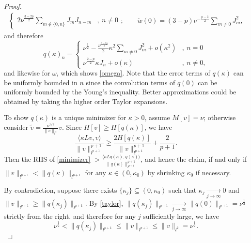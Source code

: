\documentclass{article}
\numberwithin{equation}{section}
\begin{document}
\begin{proof}
\begin{equation*}
\begin{split}
\begin{cases}
            2 \nu^{\frac{3-2p}{2}}\sum\limits_{m \notin \{0,n\}} J_{m} J_{n-m} & ,\ n \neq 0
    \end{cases};
    \qquad \ddot{w}(0) = (3-p) \nu^{-\frac{p-1}{2}} \sum_{m \neq 0} J_{m}^2,
\end{split}
\end{equation*}
and therefore
\begin{equation}\label{taylor}
    q(\kappa)_n = 
    \begin{cases}
            \nu^{\frac{1}{2}}-\frac{\nu^{\frac{3-2p}{2}}}{2}\kappa^2 \sum\limits_{m \neq 0} J_{m}^2 + o(\kappa^2)
            & ,\ n = 0\\
            \nu^{\frac{2-p}{2}}\kappa J_{n} + o(\kappa)& ,\ n \neq 0,
    \end{cases}
\end{equation}
and likewise for $\omega$, which shows \eqref{omega}. Note that the error terms of $q(\kappa)$ can be uniformly bounded in $n$ since the convolution terms of $\ddot{q}(0)$ can be uniformly bounded by the Young's inequality. Better approximations could be obtained by taking the higher order Taylor expansions.

To show $q(\kappa)$ is a unique minimizer for $\kappa > 0$, assume $M[v] = \nu$; otherwise consider $\tilde{v} = \frac{\nu^{1/2}}{\| v \|_{l^2}} v$. Since $H[v] \geq H[q(\kappa)]$, we have
\begin{equation}\label{minimizer}
    \frac{\langle \kappa L v,v \rangle}{\| v \|_{l^{p+1}}^{p+1}} \geq \frac{2H[q(\kappa)]}{\| v \|_{l^{p+1}}^{p+1}} + \frac{2}{p+1}.
\end{equation}
Then the RHS of \eqref{minimizer} $> \frac{\langle \kappa L q(\kappa),q(\kappa) \rangle}{\| q(\kappa) \|_{l^{p+1}}^{p+1}}$, and hence the claim, if and only if $\| v \|_{l^{p+1}} < \| q(\kappa) \|_{l^{p+1}}$ for any $\kappa \in (0,\kappa_0)$ by shrinking $\kappa_0$ if necessary.

By contradiction, suppose there exists $\{\kappa_j\} \subseteq (0,\kappa_0)$ such that $\kappa_j \xrightarrow[j\rightarrow\infty]{} 0$ and $\| v \|_{l^{p+1}} \geq \| q(\kappa_j) \|_{l^{p+1}}$. By \eqref{taylor}, $\| q(\kappa_j) \|_{l^{p+1}} \xrightarrow[j\rightarrow\infty]{} \| q(0) \|_{l^{p+1}} = \nu^{\frac{1}{2}}$ strictly from the right, and therefore for any $j$ sufficiently large, we have
\begin{equation*}
\nu^{\frac{1}{2}} < \| q(\kappa_j)\|_{l^{p+1}} \leq \| v \|_{l^{p+1}} \leq \| v \|_{l^{2}} = \nu^{\frac{1}{2}}. 
\end{equation*}
\end{proof}
\end{document}
